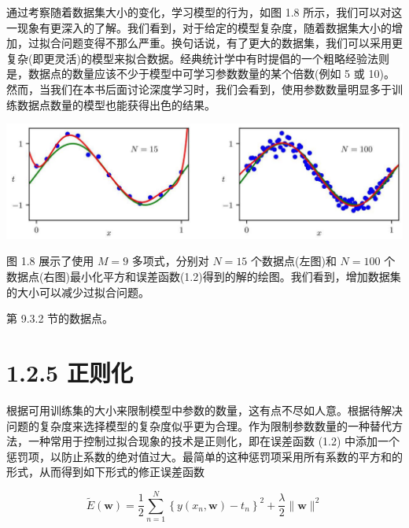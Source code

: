 \documentclass[10pt]{article}
\begin{document}
通过考察随着数据集大小的变化，学习模型的行为，如图 1.8 所示，我们可以对这一现象有更深入的了解。我们看到，对于给定的模型复杂度，随着数据集大小的增加，过拟合问题变得不那么严重。换句话说，有了更大的数据集，我们可以采用更复杂(即更灵活)的模型来拟合数据。经典统计学中有时提倡的一个粗略经验法则是，数据点的数量应该不少于模型中可学习参数数量的某个倍数(例如 5 或 10)。然而，当我们在本书后面讨论深度学习时，我们会看到，使用参数数量明显多于训练数据点数量的模型也能获得出色的结果。

\begin{center}
\includegraphics[max width=1.0\textwidth]{images/0194e279-9b28-703a-88f4-c3ac21e2010d_31_240_344_1311_382_0.jpg}
\end{center}
\hspace*{3em} 

图 1.8 展示了使用 \(M = 9\) 多项式，分别对 \(N = {15}\) 个数据点(左图)和 \(N = {100}\) 个数据点(右图)最小化平方和误差函数(1.2)得到的解的绘图。我们看到，增加数据集的大小可以减少过拟合问题。

第 9.3.2 节的数据点。

\section*{1.2.5 正则化}

根据可用训练集的大小来限制模型中参数的数量，这有点不尽如人意。根据待解决问题的复杂度来选择模型的复杂度似乎更为合理。作为限制参数数量的一种替代方法，一种常用于控制过拟合现象的技术是正则化，即在误差函数 (1.2) 中添加一个惩罚项，以防止系数的绝对值过大。最简单的这种惩罚项采用所有系数的平方和的形式，从而得到如下形式的修正误差函数

\[
\widetilde{E}\left( \mathbf{w}\right)  = \frac{1}{2}\mathop{\sum }\limits_{{n = 1}}^{N}{\left\{  y\left( {x}_{n},\mathbf{w}\right)  - {t}_{n}\right\}  }^{2} + \frac{\lambda }{2}\parallel \mathbf{w}{\parallel }^{2} \tag{1.4}
\]
\end{document}
